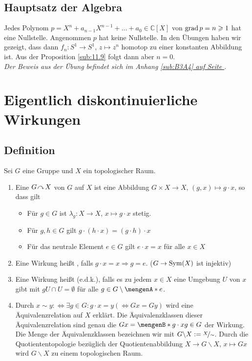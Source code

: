 \subsection{Hauptsatz der Algebra} %
\label{sub:1111}
Jedes Polynom $p = X^n + a_{n-1} X^{n-1} + \ldots  + a_0 \in \mathds{C}[X]$ von $\operatorname{grad} p = n \geqslant 1$ hat eine Nullstelle.
Angenommen $p$ hat keine Nullstelle. In den Übungen haben wir gezeigt,
dass dann $f_n : S^1 \to S^1$, $z \mapsto z^n$ homotop zu einer konstanten Abbildung ist. Aus der Proposition 
\ref{sub:11.9} folgt dann aber $n=0$. \bewende \medskip \\
\emph{Der Beweis aus der Übung befindet sich im Anhang \hyperref[sub:B3A4]{\ref*{sub:B3A4} auf Seite \pageref*{sub:B3A4}}}.
\newpage

\section{Eigentlich diskontinuierliche Wirkungen} %
\label{sec:12}

\subsection[Definition: Eigentlich diskontinuierliche Wirkung]{Definition} %
\label{sub:12.1}
Sei $G$ eine Gruppe und $X$ ein topologischer Raum.
\begin{enumerate}[(1)]
	\item Eine  $G \!\curvearrowright\! X$ von $G$ auf $X$ ist eine Abbildung $G \times X \to X$, $(g,x) \mapsto g \cdot x$, so dass gilt
	\begin{itemize}
		\item Für $g \in G$ ist $\lambda_g : X \to X$, $x \mapsto g \cdot x$ stetig.
		\item Für $g,h \in G$ gilt $g \cdot (h \cdot x)= (g \cdot h) \cdot x$
		\item Für das neutrale Element $e \in G$ gilt $e \cdot x = x$ für alle $x \in X$
	\end{itemize}
	\item Eine Wirkung heißt , falls $g \cdot x = x \Rightarrow g = e$. \hfill {\color{gray} ($G \to \operatorname{Sym}(X)$ ist injektiv)}
	\item Eine Wirkung heißt  (e.d.k.), falls es zu jedem $x \in X$ eine Umgebung $U$ von $x$
	gibt mit $g U\cap U = \emptyset$ für alle $g \in G \setminus \set{e}$.
	\item Durch $x \sim y :\Leftrightarrow \exists g \in G : g \cdot x = y (\Leftrightarrow G x = G y)$ wird eine 
	Äquivalenzrelation auf $X$ erklärt. Die Äquivalenzklassen dieser Äquivalenzrelation sind genau die  $Gx =\set[g\cdot x]{g \in G}$ der Wirkung.
	Die Menge der Äquivalenzklassen bezeichnen wir mit $G \backslash X := \nicefrac{X}{\sim}$. Durch die Quotiententopologie bezüglich der Quotientenabbildung 
	$X \to G\backslash X$, $x \mapsto G x$ wird $G \backslash X$ zu einem topologischen Raum.
\end{enumerate}

